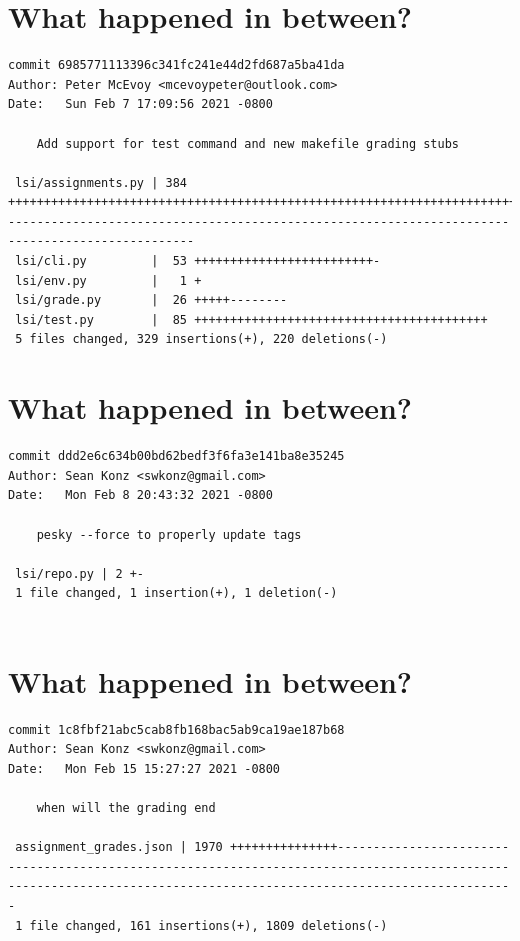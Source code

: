 \documentclass{article}
\begin{document}
\section*{What happened in between?}
\vspace{2ex}
\begin{verbatim}
commit 6985771113396c341fc241e44d2fd687a5ba41da
Author: Peter McEvoy <mcevoypeter@outlook.com>
Date:   Sun Feb 7 17:09:56 2021 -0800

    Add support for test command and new makefile grading stubs

 lsi/assignments.py | 384 ++++++++++++++++++++++++++++++++++++++++++++++++++++++++++++++++++++++++++++++++++++++++-------------------------------------------------------------------------------------------------
 lsi/cli.py         |  53 +++++++++++++++++++++++++-
 lsi/env.py         |   1 +
 lsi/grade.py       |  26 +++++--------
 lsi/test.py        |  85 +++++++++++++++++++++++++++++++++++++++++
 5 files changed, 329 insertions(+), 220 deletions(-)

\end{verbatim}

\newpage

\section*{What happened in between?}
\vspace{2ex}
\begin{verbatim}
commit ddd2e6c634b00bd62bedf3f6fa3e141ba8e35245
Author: Sean Konz <swkonz@gmail.com>
Date:   Mon Feb 8 20:43:32 2021 -0800

    pesky --force to properly update tags

 lsi/repo.py | 2 +-
 1 file changed, 1 insertion(+), 1 deletion(-)


\end{verbatim}

\newpage

\section*{What happened in between?}
\vspace{2ex}
\begin{verbatim}
commit 1c8fbf21abc5cab8fb168bac5ab9ca19ae187b68
Author: Sean Konz <swkonz@gmail.com>
Date:   Mon Feb 15 15:27:27 2021 -0800

    when will the grading end

 assignment_grades.json | 1970 +++++++++++++++---------------------------------------------------------------------------------------------------------------------------------------------------------------------
 1 file changed, 161 insertions(+), 1809 deletions(-)
\end{verbatim}
\end{document}
